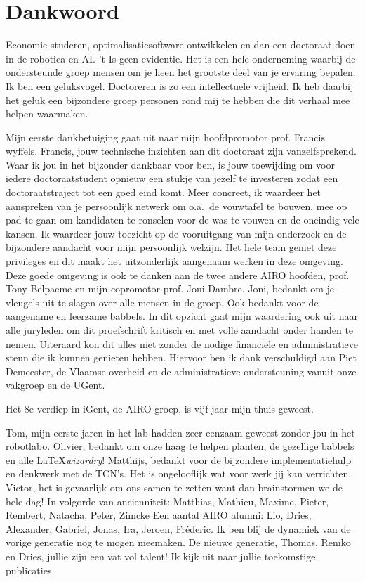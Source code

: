 \documentclass[\home/main.tex]{subfiles}
\begin{document}
	
\chapter{Dankwoord}

Economie studeren, optimalisatiesoftware ontwikkelen en dan een doctoraat doen in de robotica en AI. 't Is geen evidentie. Het is een hele onderneming waarbij de ondersteunde groep mensen om je heen het grootste deel van je ervaring bepalen. 
Ik ben een geluksvogel. Doctoreren is zo een intellectuele vrijheid. Ik heb daarbij het geluk een bijzondere groep personen rond mij te hebben die dit verhaal mee helpen waarmaken. 

Mijn eerste dankbetuiging gaat uit naar mijn hoofdpromotor prof. Francis wyffels. Francis, jouw technische inzichten aan dit doctoraat zijn vanzelfsprekend. Waar ik jou in het bijzonder dankbaar voor ben, is jouw toewijding om voor iedere doctoraatstudent opnieuw een stukje van jezelf te investeren zodat een doctoraatstraject tot een goed eind komt. Meer concreet, ik waardeer het aanspreken van je persoonlijk netwerk om o.a.\ de vouwtafel te bouwen, mee op pad te gaan om kandidaten te ronselen voor de was te vouwen en de oneindig vele kansen. Ik waardeer jouw toezicht op de vooruitgang van mijn onderzoek en de bijzondere aandacht voor mijn persoonlijk welzijn. Het hele team geniet deze privileges en dit maakt het uitzonderlijk aangenaam werken in deze omgeving. Deze goede omgeving is ook te danken aan de twee andere AIRO hoofden, prof. Tony Belpaeme en mijn copromotor prof. Joni Dambre. Joni, bedankt om je vleugels uit te slagen over alle mensen in de groep. Ook bedankt voor de aangename en leerzame babbels. In dit opzicht gaat mijn waardering ook uit naar alle juryleden om dit proefschrift kritisch en met volle aandacht onder handen te nemen.
Uiteraard kon dit alles niet zonder de nodige financiële en administratieve steun die ik kunnen genieten hebben. Hiervoor ben ik dank verschuldigd aan Piet Demeester, de Vlaamse overheid en de administratieve ondersteuning vanuit onze vakgroep en de UGent.

Het 8e verdiep in iGent, de AIRO groep, is vijf jaar mijn thuis geweest. 

Tom, mijn eerste jaren in het lab hadden zeer eenzaam geweest zonder jou in het robotlabo. Olivier, bedankt om onze haag te helpen planten, de gezellige babbels en alle \LaTeX \textit{wizardry}!  
Matthijs, bedankt voor de bijzondere implementatiehulp en denkwerk met de TCN's. Het is ongelooflijk wat voor werk jij kan verrichten. Victor, het is gevaarlijk om ons samen te zetten want dan brainstormen we de hele dag! 
In volgorde van ancienniteit: Matthias, Mathieu, Maxime, Pieter, Rembert, Natacha, Peter, Zimcke 
Een aantal AIRO alumni: Lio, Dries, Alexander, Gabriel, Jonas, Ira, Jeroen, Fréderic. Ik ben blij de dynamiek van de vorige generatie nog te mogen meemaken. 
De nieuwe generatie, Thomas, Remko en Dries, jullie zijn een vat vol talent! Ik kijk uit naar jullie toekomstige publicaties. 
\end{document}
